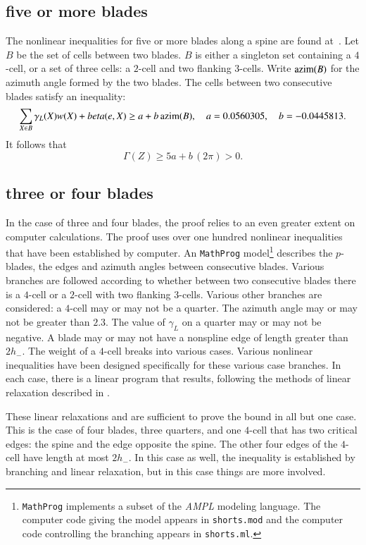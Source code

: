 \subsection{five or more blades}

The nonlinear inequalities for five or more blades along a spine are found at~\cite[cc:5bl:ZTGIJCF]{hales:2009:nonlinear}.   Let $B$ be the set of cells between two blades.  $B$ is either a singleton set containing a $4$-cell, or a set of three cells: a $2$-cell and two flanking $3$-cells.  Write ${\operatorname{azim}}(B)$ for the azimuth angle formed by the two blades.   The cells between two consecutive blades satisfy an inequality:
$$
\sum_{X\in B} \gamma_L(X)w(X) + beta(e,X) \ge a + b\,{\operatorname{azim}}(B),
\quad a= 0.0560305, \quad b= -0.0445813.
$$
It follows that
$$
\Gamma(Z) \ge 5 a + b\, (2\pi) > 0.
$$

\subsection{three or four blades}

In the case of three and four blades, the proof relies to an even greater extent on computer calculations.
The proof uses over one hundred nonlinear inequalities that have been established by computer.  An {\tt MathProg} model\footnote{{\tt MathProg} implements a subset of the {\it AMPL} modeling language.  The computer code giving the model appears in {\tt shorts.mod} and the computer code controlling the branching appears in {\tt shorts.ml}.} describes the $p$-blades, the edges and azimuth angles between consecutive blades.  Various branches are followed according to whether between two consecutive blades there is a $4$-cell or a $2$-cell with two flanking $3$-cells.   Various other branches are considered: a $4$-cell may or may not be a quarter.  The azimuth angle may or may not be greater than $2.3$.  The value of $\gamma_L$ on a quarter may or may not be negative.  A blade may or may not have a nonspline edge of length greater than $2h_-$.  The weight of a $4$-cell breaks into various cases.   Various nonlinear inequalities have been designed specifically for these various case branches.  In each case, there is a linear program that results, following the methods of linear relaxation described in \cite{Hales:2006:DCG}.  

These linear relaxations and are sufficient to prove the bound in all but one case.  This is the case of four blades, three quarters, and one $4$-cell that has two critical edges: the spine and the edge opposite the spine.  The other four edges of the $4$-cell have length at most $2h_-$.  In this case as well, the inequality is established by branching and linear relaxation, but in this case things are more involved.  

